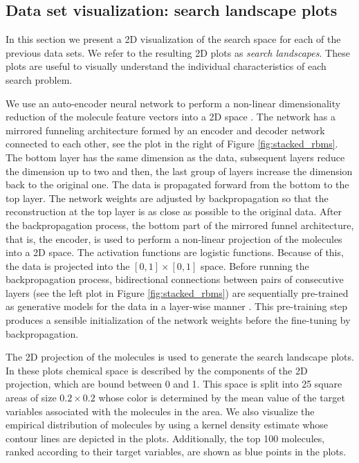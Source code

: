 \subsection{Data set visualization: search landscape plots}

In this section we present a 2D visualization of the search space for each of
the previous data sets. We refer to the resulting 2D plots as \emph{search
landscapes}. These plots are useful to visually understand the individual
characteristics of each search problem. 

We use an
auto-encoder neural network to perform a non-linear dimensionality reduction of the molecule feature vectors
into a 2D space \cite{Hinton_2006}. The network has a mirrored
funneling architecture formed by an encoder and decoder network connected to
each other, see the plot in the
right of Figure \ref{fig:stacked_rbms}. The bottom layer has the same dimension as the data, subsequent
layers reduce the dimension up to two and then, the last group of layers
increase the dimension back to the original one. 
The data is propagated forward from the bottom to the top layer. The network
weights are adjusted by backpropagation so that the reconstruction at the top
layer is as close as possible to the original data. After
the backpropagation process, the bottom part of the mirrored funnel architecture, that is, the
encoder, is used to perform a non-linear projection of the molecules into a 2D
space. The activation functions are logistic functions. Because of this, the data is projected into the $[0,1]\times[0,1]$ space. Before running the backpropagation process, bidirectional
connections between pairs of consecutive layers (see the left plot in Figure
\ref{fig:stacked_rbms}) are sequentially pre-trained as
generative models for the data in a layer-wise manner \cite{Hinton_2006}. This pre-training step
produces a sensible initialization of the network weights before the fine-tuning by backpropagation.

The 2D projection of the molecules is used to generate the search
landscape plots. In these plots chemical space is described by the components of the 2D projection,
which are bound between 0 and 1. This space is split into 25 square areas of size $0.2 \times 0.2$ whose 
color is determined by the mean value of the target variables associated with the molecules in the area. We also visualize the empirical distribution of molecules by using a kernel density estimate whose contour lines are depicted in the plots. Additionally, the top 100 molecules, ranked
according to their target variables, are shown as blue points in the plots.  

